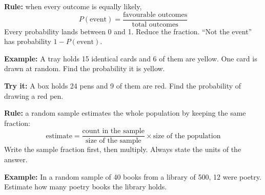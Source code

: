 \documentclass[12pt]{article}
\begin{document}


\begin{formulabox}
\textbf{Rule:} when every outcome is equally likely,
\[
  P(\text{event}) = \frac{\text{favourable outcomes}}{\text{total outcomes}}
\]
Every probability lands between 0 and 1. Reduce the fraction. ``Not the event''
has probability $1 - P(\text{event})$.
\end{formulabox}

\begin{examplebox}
\textbf{Example:} \quad A tray holds 15 identical cards and 6 of them are
yellow. One card is drawn at random. Find the probability it is yellow.
\end{examplebox}

\begin{tryitbox}
\textbf{Try it:} \quad A box holds 24 pens and 9 of them are red. Find the
probability of drawing a red pen.\\[2pt]
\end{tryitbox}


\begin{formulabox}
\textbf{Rule:} a random sample estimates the whole population by keeping the
same fraction:
\[
  \text{estimate} = \frac{\text{count in the sample}}{\text{size of the sample}}
  \times \text{size of the population}
\]
Write the sample fraction first, then multiply. Always state the units of the
answer.
\end{formulabox}

\begin{examplebox}
\textbf{Example:} \quad In a random sample of 40 books from a library of 500, 12
were poetry. Estimate how many poetry books the library holds.
\end{examplebox}
\end{document}
